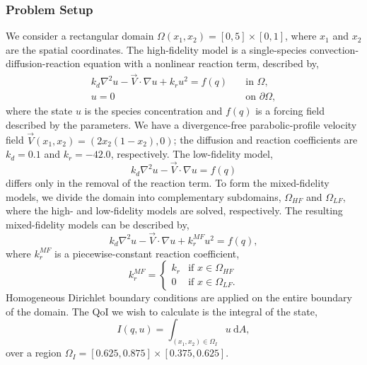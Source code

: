 \documentclass[review]{siamart0516}
\begin{document}
\subsubsection{Problem Setup} \label{sec:cdvcdrSetup}
%
We consider a rectangular domain $\Omega(x_1,x_2)=[0,5]\times[0,1]$, where $x_1$ and $x_2$ are the spatial coordinates. The high-fidelity model is a single-species convection-diffusion-reaction equation with a nonlinear reaction term, described by,
%
\begin{subequations}
\label{eq:cdvcdrHF}
\begin{align}
k_d\nabla^2 u - \vec{V}\cdot\nabla u + k_ru^2 = f(q) \quad &\text{in } \Omega, \label{eq:cdvcdrHF_int} \\
u = 0 \quad &\text{on } \partial \Omega, \label{eq:cdvcdrHF_bdry}
\end{align}
\end{subequations}
%
where the state $u$ is the species concentration and $f(q)$ is a forcing field described by the parameters. We have a divergence-free parabolic-profile velocity field $\vec{V}(x_1,x_2) = (2x_2(1-x_2),0)$; the diffusion and reaction coefficients are $k_d = 0.1$ and $k_r = -42.0$, respectively. The low-fidelity model,
%
\begin{equation}
k_d\nabla^2 u - \vec{V}\cdot\nabla u = f(q)
\end{equation}
%
differs only in the removal of the reaction term. To form the mixed-fidelity models, we divide the domain into complementary subdomains, $\Omega_{HF}$ and $\Omega_{LF}$, where the high- and low-fidelity models are solved, respectively. The resulting mixed-fidelity models can be described by,
%
\begin{equation}
k_d\nabla^2 u - \vec{V}\cdot\nabla u + k^{MF}_ru^2= f(q),
\end{equation}
%
where $k^{MF}_r$ is a piecewise-constant reaction coefficient,
%
\begin{equation}
k^{MF}_r=
\begin{cases}
k_r & \textrm{if }x\in\Omega_{HF} \\
0 & \textrm{if }x\in\Omega_{LF}.
\end{cases}
\end{equation}
%
Homogeneous Dirichlet boundary conditions are applied on the entire boundary of the domain. The QoI we wish to calculate is the integral of the state,
%
\begin{equation}
I(q,u)=\int_{(x_1,x_2)\in \Omega_I} u \:\textrm{d}A,
\end{equation}
%
over a region $\Omega_I=[0.625,0.875]\times[0.375,0.625]$.
\end{document}
